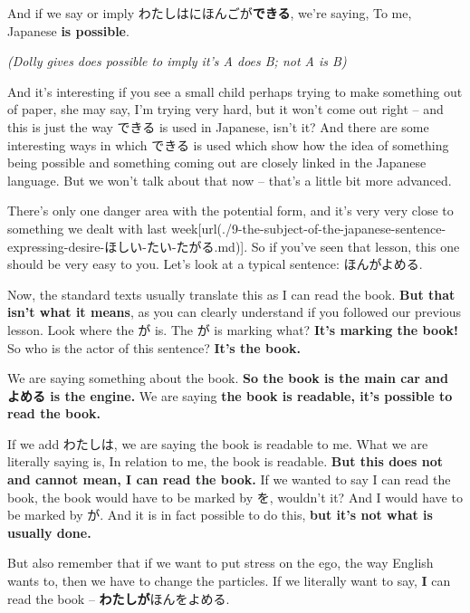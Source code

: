 {}

And if we say or imply わたしはにほんごが{\bf できる}, we're saying, To me, Japanese {\bf is possible}.

{\em (Dolly gives does possible to imply it's A does B; not A is B)}

And it's interesting if you see a small child perhaps trying to make something out of paper, she may say, I'm trying very hard, but it won't come out right -- and this is just the way できる is used in Japanese, isn't it? And there are some interesting ways in which できる is used which show how the idea of something being possible and something coming out are closely linked in the Japanese language. But we won't talk about that now -- that's a little bit more advanced.

There's only one danger area with the potential form, and it's very very close to something we dealt with last week\goto{{[}9{]}}[url(./9-the-subject-of-the-japanese-sentence-expressing-desire-ほしい-たい-たがる.md)]. So if you've seen that lesson, this one should be very easy to you. Let's look at a typical sentence: ほんがよめる.

{}

Now, the standard texts usually translate this as I can read the book. {\bf But that isn't what it means}, as you can clearly understand if you followed our previous lesson. Look where the が is. The が is marking what? {\bf It's marking the book!} So who is the actor of this sentence? {\bf It's the book.}

{}

We are saying something about the book. {\bf So the book is the main car and よめる is the engine.} We are saying {\bf the book is readable, it's possible to read the book.}

\thinrule

If we add わたしは, we are saying the book is readable to me. What we are literally saying is, In relation to me, the book is readable. {\bf But this does not and cannot mean, I can read the book.} If we wanted to say I can read the book, the book would have to be marked by を, wouldn't it? And I would have to be marked by が. And it is in fact possible to do this, {\bf but it's not what is usually done.}

But also remember that if we want to put stress on the ego, the way English wants to, then we have to change the particles. If we literally want to say, {\bf I} can read the book -- {\bf わたしが}ほんをよめる.

